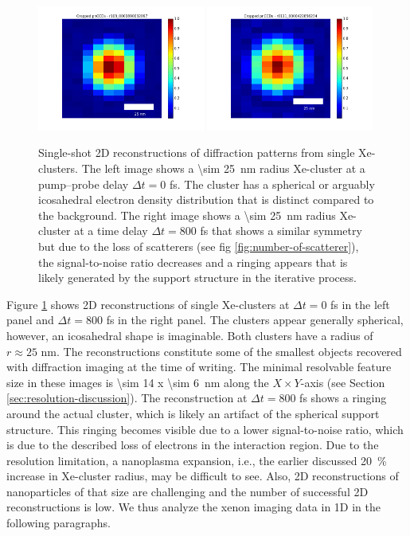 \begin{figure}
	\centering
		\includegraphics[width=0.49\textwidth]{images/results/Xe_0_fs.png}
		\includegraphics[width=0.49\textwidth]{images/results/Xe_800_fs.png}
	\caption[Single-shot 2D reconstructions of \SI{\sim 25}{\nano\meter} radius Xe-clusters.]{Single-shot 2D reconstructions of diffraction patterns from single Xe-clusters. The left image shows a \SI{\sim 25}{\nano\meter} radius Xe-cluster at a pump--probe delay $\Delta t=0$ fs. The cluster has a spherical or arguably icosahedral electron density distribution that is distinct compared to the background. The right image shows a \SI{\sim 25}{\nano\meter} radius Xe-cluster at a time delay $\Delta t=800$ fs that shows a similar symmetry but due to the loss of scatterers (see fig \ref{fig:number-of-scatterer}), the signal-to-noise ratio decreases and a ringing appears that is likely generated by the support structure in the iterative process.}
	\label{fig:Xe-2D-reconstructions}
\end{figure}
Figure \ref{fig:Xe-2D-reconstructions} shows 2D reconstructions of single Xe-clusters at $\Delta t = 0$ fs in the left panel and $\Delta t=800$ fs in the right panel. The clusters appear generally spherical, however, an icosahedral shape is imaginable. Both clusters have a radius of $r\approx 25$ nm. The reconstructions constitute some of the smallest objects recovered with diffraction imaging at the time of writing. The minimal resolvable feature size in these images is \SI{\sim 14 x \sim 6}{\nano\meter} along the $X \times Y$-axis (see Section \ref{sec:resolution-discussion}). The reconstruction at $\Delta t=800$ fs shows a ringing around the actual cluster, which is likely an artifact of the spherical support structure. This ringing becomes visible due to a lower signal-to-noise ratio, which is due to the described loss of electrons in the interaction region. Due to the resolution limitation, a nanoplasma expansion, i.e., the earlier discussed \SI{20}{\percent} increase in Xe-cluster radius, may be difficult to see. Also, 2D reconstructions of nanoparticles of that size are challenging and the number of successful 2D reconstructions is low. We thus analyze the xenon imaging data in 1D in the following paragraphs.\\[1\baselineskip]
